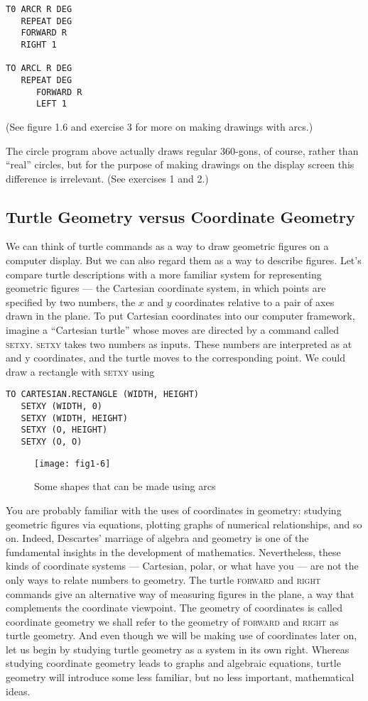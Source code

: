 \documentclass{book}
\begin{document}
\begin{verbatim}
T0 ARCR R DEG
   REPEAT DEG
   FORWARD R
   RIGHT 1

TO ARCL R DEG
   REPEAT DEG
      FORWARD R
      LEFT 1
\end{verbatim}
(See figure 1.6 and exercise 3 for more on making drawings with arcs.)

The circle program above actually draws regular 360-gons, of course,
rather than ``real'' circles, but for the purpose of making drawings on
the display screen this difference is irrelevant. (See exercises 1 and 2.)

\subsection{Turtle Geometry versus Coordinate Geometry}

We can think of turtle commands as a way to draw geometric figures on
a computer display. But we can also regard them as a way to describe
figures. Let's compare turtle descriptions with a more familiar system
for representing geometric figures --- the Cartesian coordinate system, in
which points are specified by two numbers, the $x$ and $y$ coordinates relative to a pair of axes drawn in the plane. To put Cartesian coordinates
into our computer framework, imagine a ``Cartesian turtle'' whose moves
are directed by a command called \textsc{setxy}. \textsc{setxy} takes two numbers as
inputs. These numbers are interpreted as at and y coordinates, and the
turtle moves to the corresponding point. We could draw a rectangle with
\textsc{setxy} using

\begin{verbatim}
TO CARTESIAN.RECTANGLE (WIDTH, HEIGHT)
   SETXY (WIDTH, 0)
   SETXY (WIDTH, HEIGHT)
   SETXY (O, HEIGHT)
   SETXY (O, O)
\end{verbatim}

\begin{figure}
\begin{center}
\texttt{[image: fig1-6]}
\caption{Some shapes that can be made using arcs}
\end{center}
\end{figure}

You are probably familiar with the uses of coordinates in geometry:
studying geometric figures via equations, plotting graphs of numerical
relationships, and so on. Indeed, Descartes' marriage of algebra and
geometry is one of the fundamental insights in the development of mathematics. Nevertheless, these kinds of coordinate systems --- Cartesian,
polar, or what have you --- are not the only ways to relate numbers to
geometry. The turtle \textsc{forward} and \textsc{right} commands give an alternative way of measuring figures in the plane, a way that complements the
coordinate viewpoint. The geometry of coordinates is called coordinate
geometry we shall refer to the geometry of \textsc{forward} and \textsc{right} as turtle
geometry. And even though we will be making use of coordinates later
on, let us begin by studying turtle geometry as a system in its own right.
Whereas studying coordinate geometry leads to graphs and algebraic
equations, turtle geometry will introduce some less familiar, but no less
important, mathematical ideas.
\end{document}
